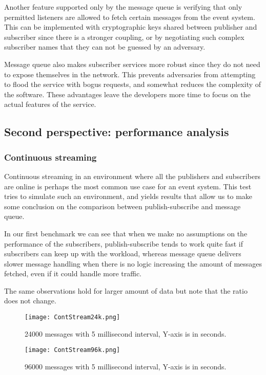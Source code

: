 \documentclass[conference]{IEEEtran}
\begin{document}
Another feature supported only by the message queue is verifying that only permitted listeners are allowed to fetch certain messages from the event system. This can be implemented with cryptographic keys shared between publisher and subscriber since there is a stronger coupling, or by negotiating such complex subscriber names that they can not be guessed by an adversary.

Message queue also makes subscriber services more robust since they do not need to expose themselves in the network. This prevents adversaries from attempting to flood the service with bogus requests, and somewhat reduces the complexity of the software. These advantages leave the developers more time to focus on the actual features of the service.

\subsection{Second perspective: performance analysis}
\subsubsection{Continuous streaming}
Continuous streaming in an environment where all the publishers and subscribers are online is perhaps the most common use case for an event system. This test tries to simulate such an environment, and yields results that allow us to make some conclusion on the comparison  between publish-subscribe and message queue.

In our first benchmark we can see that when we make no assumptions on the performance of the subscribers, publish-subscribe tends to work quite fast if subscribers can keep up with the workload, whereas message queue delivers slower message handling when there is no logic increasing the amount of messages fetched, even if it could handle more traffic.

The same observations hold for larger amount of data but note that the ratio does not change.

\begin{figure}
    \centering
    \texttt{[image: ContStream24k.png]}
    \caption{24000 messages with 5 millisecond interval, Y-axis is in seconds.}
\end{figure}

\begin{figure}
    \centering
    \texttt{[image: ContStream96k.png]}
    \caption{96000 messages with 5 millisecond interval, Y-axis is in seconds.}
\end{figure}
\end{document}
